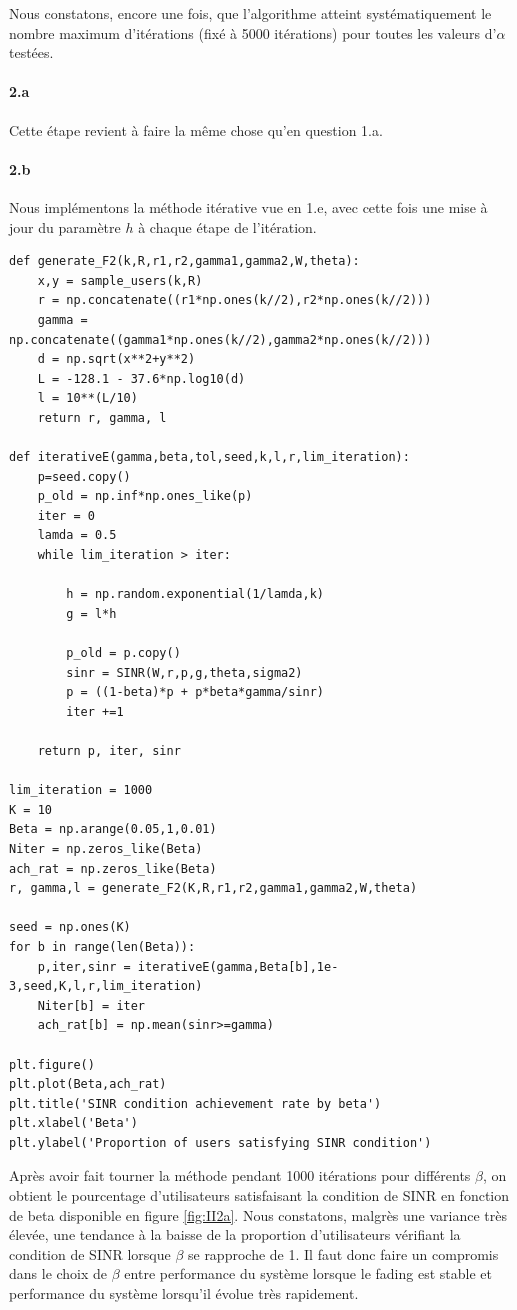 \documentclass[a4paper,11pt,2]{article}
\begin{document}
Nous constatons, encore une fois, que l'algorithme atteint systématiquement le nombre maximum d'itérations (fixé à 5000 itérations) pour toutes les valeurs d'$\alpha$ testées.

\paragraph{2.a} Cette étape revient à faire la même chose qu'en question 1.a.

\paragraph{2.b} Nous implémentons la méthode itérative vue en 1.e, avec cette fois une mise à jour du paramètre $h$ à chaque étape de l'itération.
\begin{center}
\begin{lstlisting}
def generate_F2(k,R,r1,r2,gamma1,gamma2,W,theta):
    x,y = sample_users(k,R)
    r = np.concatenate((r1*np.ones(k//2),r2*np.ones(k//2)))
    gamma = np.concatenate((gamma1*np.ones(k//2),gamma2*np.ones(k//2)))
    d = np.sqrt(x**2+y**2)
    L = -128.1 - 37.6*np.log10(d)
    l = 10**(L/10)
    return r, gamma, l

def iterativeE(gamma,beta,tol,seed,k,l,r,lim_iteration):
    p=seed.copy()
    p_old = np.inf*np.ones_like(p)
    iter = 0
    lamda = 0.5
    while lim_iteration > iter:

        h = np.random.exponential(1/lamda,k)
        g = l*h

        p_old = p.copy()
        sinr = SINR(W,r,p,g,theta,sigma2)
        p = ((1-beta)*p + p*beta*gamma/sinr)
        iter +=1
        
    return p, iter, sinr

lim_iteration = 1000
K = 10
Beta = np.arange(0.05,1,0.01)
Niter = np.zeros_like(Beta)
ach_rat = np.zeros_like(Beta)
r, gamma,l = generate_F2(K,R,r1,r2,gamma1,gamma2,W,theta)

seed = np.ones(K)
for b in range(len(Beta)):
    p,iter,sinr = iterativeE(gamma,Beta[b],1e-3,seed,K,l,r,lim_iteration)
    Niter[b] = iter
    ach_rat[b] = np.mean(sinr>=gamma)

plt.figure()
plt.plot(Beta,ach_rat)
plt.title('SINR condition achievement rate by beta')
plt.xlabel('Beta')
plt.ylabel('Proportion of users satisfying SINR condition')
\end{lstlisting}
\end{center}

Après avoir fait tourner la méthode pendant 1000 itérations pour différents $\beta$, on obtient le pourcentage d'utilisateurs satisfaisant la condition de SINR en fonction de beta disponible en figure \ref{fig:II2a}. Nous constatons, malgrès une variance très élevée, une tendance à la baisse de la proportion d'utilisateurs vérifiant la condition de SINR lorsque $\beta$ se rapproche de 1. Il faut donc faire un compromis dans le choix de $\beta$ entre performance du système lorsque le fading est stable et performance du système lorsqu'il évolue très rapidement.
\end{document}
